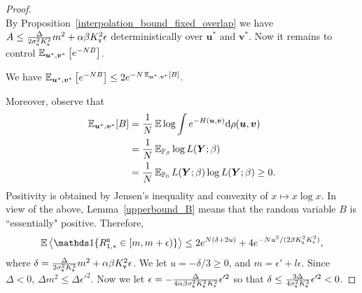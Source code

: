 \documentclass[final,12pt]{colt2018} %
\newcommand{\utt}{\textup{\texttt{u}}}
\newcommand{\vtt}{\textup{\texttt{v}}}
\renewcommand{\u}{\bm{u}}
\renewcommand{\v}{\bm{v}}
\newcommand{\Y}{\bm{Y}}
\begin{document}
\begin{proof}
\begin{equation*}
\end{equation*}
By Proposition~\ref{interpolation_bound_fixed_overlap} we have $A \le \frac{\Delta}{2\sigma_\utt^2K_\utt^2}  m^2 + \alpha\beta K_{\vtt}^2\epsilon$ deterministically over $\u^*$ and $\v^*$. Now it remains to control $\E_{\u^*,\v^*}\left[e^{-NB}\right]$.
\begin{lemma}\label{upperbound_B}
We have $\E_{\u^*,\v^*}\left[e^{-NB}\right] \le 2 e^{-N\E_{\u^*,\v^*}[B]}$.
\end{lemma}
Moreover, observe that
\begin{align*}
\E_{\u^*,\v^*}[B] &= \frac{1}{N} \E\log \int e^{-H(\u,\v)}\rmd\rho(\u,\v) \\
&=  \frac{1}{N} \E_{\P_{\beta}} \log L(\Y;\beta) \\
&= \frac{1}{N} \E_{\P_{0}} L(\Y;\beta)\log L(\Y;\beta) \ge 0.
\end{align*} 
Positivity is obtained by Jensen's inequality and convexity of $x \mapsto x\log x$. In view of the above, Lemma~\ref{upperbound_B} means that the random variable $B$ is ``essentially" positive. Therefore,
\[\E \left\langle \indi \{ R^{\utt}_{1,*} \in [m,m+\epsilon) \} \right\rangle \le 2e^{N(\delta+2u)} + 4e^{-Nu^2/(2\beta K_{\utt}^2 K_{\vtt}^2)},\]
where $\delta = \frac{\Delta}{2\sigma_\utt^2K_\utt^2}  m^2 + \alpha\beta K_{\vtt}^2\epsilon$.
We let $u = -\delta/3 \ge 0$, and $m = \epsilon'+l\epsilon$. Since $\Delta <0$, $\Delta m^2 \le \Delta \epsilon'^2$. 
Now we let $\epsilon = - \frac{\Delta}{4\alpha\beta\sigma_\utt^2K_\utt^2K_\vtt^2}  \epsilon'^2$ so that $\delta \le \frac{3\Delta}{4\sigma_\utt^2K_\utt^2} \epsilon'^2 <0$.
 \end{proof}
\end{document}
